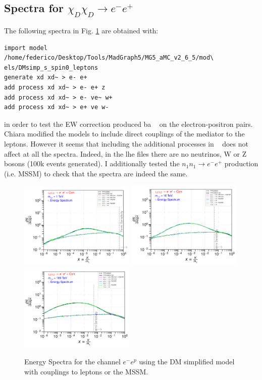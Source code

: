 \documentclass[epj,nopacs,fleqn]{svjour}
\begin{document}
\clearpage
\subsection{Spectra for $\chi_D \chi_D \rightarrow e^- e^+$}
The following spectra in Fig. \ref{ee} are obtained with:
\begin{verbatim}
import model /home/federico/Desktop/Tools/MadGraph5/MG5_aMC_v2_6_5/mod\
els/DMsimp_s_spin0_leptons
generate xd xd~ > e- e+
add process xd xd~ > e- e+ z
add process xd xd~ > e- ve~ w+
add process xd xd~ > e+ ve w-
\end{verbatim}
in order to test the EW correction produced ba \MG~ on the electron-positron pairs. Chiara modified the models to include direct couplings of the mediator to the leptons.
However it seems that including the additional processes in \MG~ does not affect at all the spectra. Indeed, in the lhe files there are no neutrinos, W or Z bosons (100k events generated). I additionally tested the $n_1 n_1 \rightarrow e^- e^+$ production (i.e. MSSM) to check that the spectra are indeed the same. 
\begin{figure}[!b]
	\centering
	\subfigure
	{ \includegraphics[width=0.49\textwidth]{Fig/xdxd_eeEW/1_gammas_eeEW_1.pdf}}
	\subfigure
	{\includegraphics[width=0.49\textwidth]{Fig/xdxd_eeEW/10_gammas_eeEW_10.pdf}}
	\subfigure
	{\includegraphics[width=0.49\textwidth]{Fig/xdxd_eeEW/100_gammas_eeEW_100.pdf}}

	\caption{Energy Spectra for the channel $e^- e^p$ using the DM simplified model with couplings to leptons or the MSSM. }
	\label{ee}
\end{figure}
\end{document}
